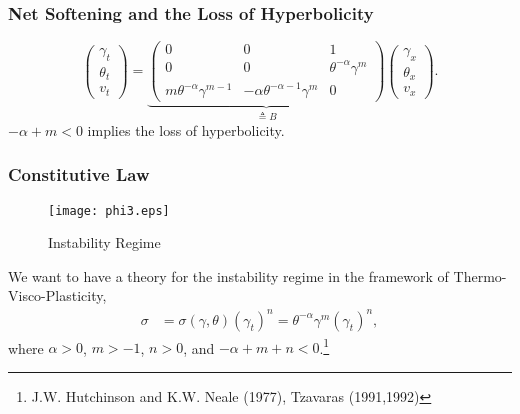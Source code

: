 \documentclass{beamer}
\def\red{\color{red}}
\def\blue{\color{blue}}
\begin{document}
\begin{frame}
 \frametitle{Net Softening and the Loss of Hyperbolicity}
\begin{equation} \label{eq:transport}
 \begin{pmatrix} \gamma_t \\ \theta_t \\ v_t \end{pmatrix} = \underbrace{
 \begin{pmatrix}
  0 & 0 & 1\\
  0 & 0 & \theta^{-\alpha}\gamma^m \\
  m\theta^{-\alpha}\gamma^{m-1} & -\alpha\theta^{-\alpha-1}\gamma^m & 0\end{pmatrix}}_\text{$\triangleq B$}
  \begin{pmatrix} \gamma_x \\ \theta_x \\ v_x \end{pmatrix}. 
\end{equation}
\vfill
$-\alpha+m<0$ implies the loss of hyperbolicity.
\end{frame}

\begin{frame}
 \frametitle{Constitutive Law}
 \begin{figure}
    \centering
    \center
    \texttt{[image: phi3.eps]} 
     \caption{Instability Regime}
    \end{figure} 
 We want to have a theory for the instability regime in the framework of Thermo-Visco-Plasticity,
 \begin{align}
  \sigma &= \sigma(\gamma,\theta)(\gamma_t)^n=\theta^{-\alpha}\gamma^m(\gamma_t)^n, 
 \end{align}%
 where $\alpha>0$, $m>-1$, $n>0$, and {\red $-\alpha +m+n<0$}.\footnote[frame]{J.W. Hutchinson and K.W. Neale (1977), Tzavaras (1991,1992)}
\end{frame}
\end{document}
